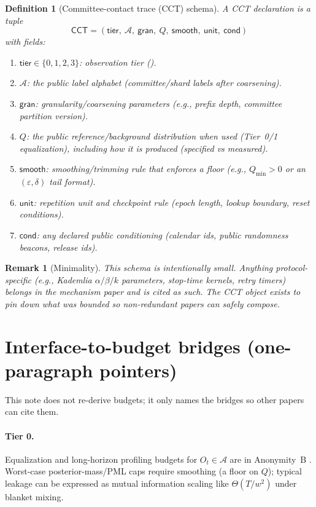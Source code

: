 \documentclass[11pt]{article}
\newtheorem{definition}{Definition}
\newtheorem{remark}{Remark}
\begin{document}
\begin{definition}[Committee-contact trace (CCT) schema]
A CCT declaration is a tuple
\[
\mathsf{CCT} = (\mathsf{tier},\ \mathcal{A},\ \mathsf{gran},\ Q,\ \mathsf{smooth},\ \mathsf{unit},\ \mathsf{cond})
\]
with fields:
\begin{enumerate}[leftmargin=*]
\item $\mathsf{tier}\in\{0,1,2,3\}$: observation tier ().
\item $\mathcal{A}$: the public label alphabet (committee/shard labels after coarsening).
\item $\mathsf{gran}$: granularity/coarsening parameters (e.g., prefix depth, committee partition version).
\item $Q$: the public reference/background distribution when used (Tier~0/1 equalization), including how it is produced (specified vs measured).
\item $\mathsf{smooth}$: smoothing/trimming rule that enforces a floor (e.g., $Q_{\min}>0$ or an $(\varepsilon,\delta)$ tail format).
\item $\mathsf{unit}$: repetition unit and checkpoint rule (epoch length, lookup boundary, reset conditions).
\item $\mathsf{cond}$: any declared public conditioning (calendar ids, public randomness beacons, release ids).
\end{enumerate}
\end{definition}

\begin{remark}[Minimality]
This schema is intentionally small.
Anything protocol-specific (e.g., Kademlia $\alpha/\beta/k$ parameters, stop-time kernels, retry timers) belongs in the mechanism paper and is cited as such.
The CCT object exists to pin down \emph{what was bounded} so non-redundant papers can safely compose.
\end{remark}

\section{Interface-to-budget bridges (one-paragraph pointers)}
This note does not re-derive budgets; it only names the bridges so other papers can cite them.

\paragraph{Tier 0.}
Equalization and long-horizon profiling budgets for $O_t\in\mathcal{A}$ are in Anonymity~B \cite{series:profiling}.
Worst-case posterior-mass/PML caps require smoothing (a floor on $Q$); typical leakage can be expressed as mutual information scaling like $\Theta(T/w^2)$ under blanket mixing.
\end{document}
